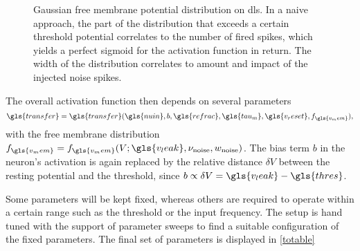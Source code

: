 %
\begin{figure}
	\begin{center}
		
	\end{center}
	\caption[Gaussian free membrane potential distribution on \gls{dls}.]{Gaussian free membrane potential distribution on \gls{dls}. In a naive approach, the part of the distribution that exceeds a certain threshold potential correlates to the number of fired spikes, which yields a perfect sigmoid for the activation function in return. The width of the distribution correlates to amount and impact of the injected noise spikes.}
	\label{vleak_w_noise}
\end{figure}

 The overall activation function then depends on several parameters
\begin{equation}
\gls{transfer} = \gls{transfer}(\gls{nuin}, b, \gls{refrac}, \gls{tau_m}, \gls{v_reset}, f_{\gls{v_mem}}),
\end{equation}
with the free membrane distribution $f_{\gls{v_mem}} = f_{\gls{v_mem}}(V; \gls{v_leak}, \nu_\text{noise}, w_\text{noise})$. 
The bias term $b$ in the neuron's activation is again replaced by the relative distance $\delta V$ between the resting potential and the threshold, since $b \propto \delta V = \gls{v_leak} - \gls{thres}$. 

Some parameters will be kept fixed, whereas others are required to operate within a certain range such as the threshold or the input frequency. The setup is hand tuned with the support of parameter sweeps to find a suitable configuration of the fixed parameters. The final set of parameters is displayed in \cref{totable}

